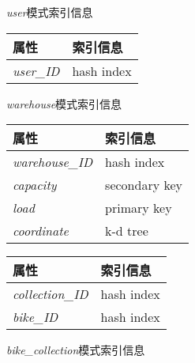 \begin{figure}[!htp]
    \begin{minipage}{0.3\textwidth}
      \centering
      \caption{\textit{user}模式索引信息}
      \label{tab:indexuser}
      \begin{tabular}{ll}\toprule
        属性&索引信息\\\midrule
       \textit{user\_ID}&hash index\\
       \bottomrule
      \end{tabular}
    \end{minipage}\hfill
    \begin{minipage}{0.3\textwidth}
      \centering
      \caption{\textit{warehouse}模式索引信息}
      \label{tab:indexwarehouse}
      \begin{tabular}{ll}\toprule
        属性&索引信息\\\midrule
       \textit{warehouse\_ID}&hash index\\
       \textit{capacity}&secondary key\\
       \textit{load}&primary key\\
       \textit{coordinate}&k-d tree\\
       \bottomrule
      \end{tabular}
    \end{minipage}\hfill
    \begin{minipage}{0.3\textwidth}
      \centering
      \caption{\textit{bike\_collection}模式索引信息}
      \label{tab:indexbikecollection}
      \begin{tabular}{ll}\toprule
        属性&索引信息\\\midrule
       \textit{collection\_ID}&hash index\\
       \textit{bike\_ID}&hash index\\
       \bottomrule
      \end{tabular}
    \end{minipage}\hfill
 \end{figure}
